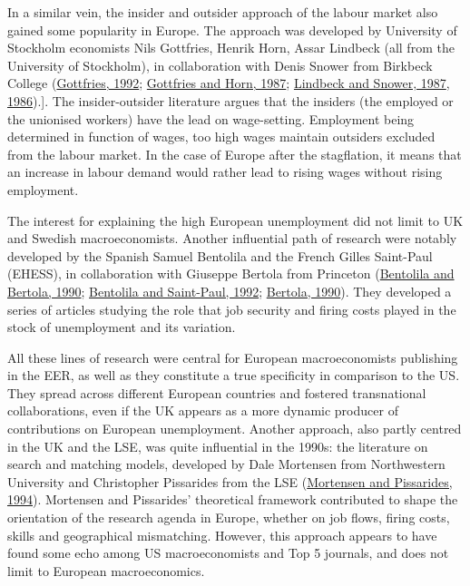 \documentclass[
  12pt,
  onecolumn]{article}
\begin{document}
In a similar vein, the insider and outsider approach of the labour
market also gained some popularity in Europe. The approach was developed
by University of Stockholm economists Nils Gottfries, Henrik Horn, Assar
Lindbeck (all from the University of Stockholm), in collaboration with
Denis Snower from Birkbeck College
(\protect\hyperlink{ref-gottfries1992}{Gottfries, 1992};
\protect\hyperlink{ref-gottfries1987}{Gottfries and Horn, 1987};
\protect\hyperlink{ref-lindbeck1987a}{Lindbeck and Snower, 1987},
\protect\hyperlink{ref-lindbeck1986}{1986}).{]}. The insider-outsider
literature argues that the insiders (the employed or the unionised
workers) have the lead on wage-setting. Employment being determined in
function of wages, too high wages maintain outsiders excluded from the
labour market. In the case of Europe after the stagflation, it means
that an increase in labour demand would rather lead to rising wages
without rising employment.

The interest for explaining the high European unemployment did not limit
to UK and Swedish macroeconomists. Another influential path of research
were notably developed by the Spanish Samuel Bentolila and the French
Gilles Saint-Paul (EHESS), in collaboration with Giuseppe Bertola from
Princeton (\protect\hyperlink{ref-bentolila1990}{Bentolila and Bertola,
1990}; \protect\hyperlink{ref-bentolila1992a}{Bentolila and Saint-Paul,
1992}; \protect\hyperlink{ref-bertola1990a}{Bertola, 1990}). They
developed a series of articles studying the role that job security and
firing costs played in the stock of unemployment and its variation.

All these lines of research were central for European macroeconomists
publishing in the EER, as well as they constitute a true specificity in
comparison to the US. They spread across different European countries
and fostered transnational collaborations, even if the UK appears as a
more dynamic producer of contributions on European unemployment. Another
approach, also partly centred in the UK and the LSE, was quite
influential in the 1990s: the literature on search and matching models,
developed by Dale Mortensen from Northwestern University and Christopher
Pissarides from the LSE (\protect\hyperlink{ref-mortensen1994}{Mortensen
and Pissarides, 1994}). Mortensen and Pissarides' theoretical framework
contributed to shape the orientation of the research agenda in Europe,
whether on job flows, firing costs, skills and geographical mismatching.
However, this approach appears to have found some echo among US
macroeconomists and Top 5 journals, and does not limit to European
macroeconomics.
\end{document}
